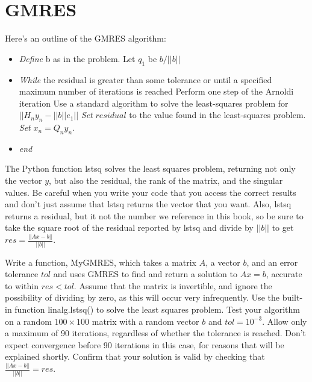 \section*{GMRES}
Here's an outline of the GMRES algorithm:
\begin{itemize}
\item \emph{Define} b as in the problem. Let $q_1$ be $b/||b||$
\item \emph{While} the residual is greater than some tolerance or until a specified maximum number of 
iterations is reached
\subitem Perform one step of the Arnoldi iteration
\subitem Use a standard algorithm to solve the least-squares problem for $||H_ny_n-||b||e_1||$
\subitem \emph{Set} $residual$ to the value found in the least-squares problem.
\subitem \emph{Set} $x_n=Q_ny_n$.
\item \emph{end}
\end{itemize}

\begin{warn}
The Python function lstsq solves the least squares problem, returning not only the vector $y$, but also the residual, the rank of the matrix, and the singular values.
Be careful when you write your code that you access the correct results and don't just assume that lstsq returns the vector that you want.
Also, lstsq returns a residual, but it not the number we reference in this book, so be sure to take the square root of the residual reported by lstsq and divide by $||b||$ to get $res=\frac{||Ax-b||}{||b||}$.
\end{warn}

\begin{problem}
\label{prob:GMRESRand}
Write a function, MyGMRES, which takes a matrix $A$, a vector $b$, and an error tolerance $tol$ and uses GMRES to find and return a solution to $Ax=b$, accurate to within $res<tol$.
Assume that the matrix is invertible, and ignore the possibility of dividing by zero, as this will occur very infrequently.
Use the built-in function linalg.lstsq() to solve the least squares problem.
Test your algorithm on a random $100\times 100$ matrix with a random vector $b$ and $tol=10^{-3}$.
Allow only a maximum of 90 iterations, regardless of whether the tolerance is reached.
Don't expect convergence before 90 iterations in this case, for reasons that will be explained shortly.
Confirm that your solution is valid by checking that $\frac{||Ax-b||}{||b||}=res$.
\end{problem}

